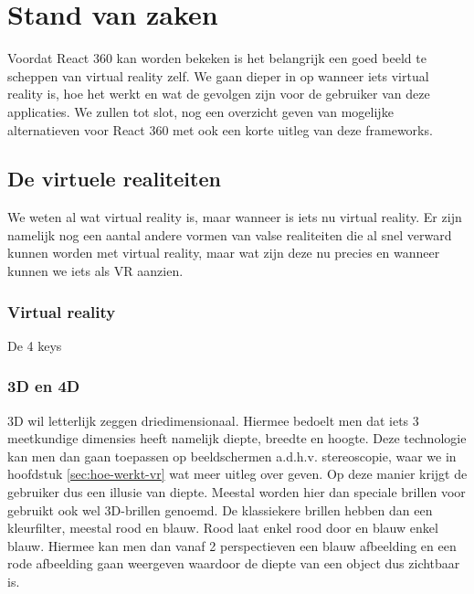 \chapter{Stand van zaken}
\label{ch:stand-van-zaken}



Voordat React 360 kan worden bekeken is het belangrijk een goed beeld te scheppen van virtual reality zelf. We gaan dieper in op wanneer iets virtual reality is, hoe het werkt en wat de gevolgen zijn voor de gebruiker van deze applicaties. We zullen tot slot, nog een overzicht geven van mogelijke alternatieven voor React 360 met ook een korte uitleg van deze frameworks.

\section{De virtuele realiteiten}
\label{sec:wanner-vr}
We weten al wat virtual reality is, maar wanneer is iets nu virtual reality. Er zijn namelijk nog een aantal andere vormen van valse realiteiten die al snel verward kunnen worden met virtual reality, maar wat zijn deze nu precies en wanneer kunnen we iets als VR aanzien.

\subsection{Virtual reality}
\label{subsec:virtual-reality}
\autocite{Sherman2000}
De 4 keys

\subsection{3D en 4D}
\label{subsec:3d-4d}
3D wil letterlijk zeggen driedimensionaal. Hiermee bedoelt men dat iets 3 meetkundige dimensies heeft namelijk diepte, breedte en hoogte. Deze technologie kan men dan gaan toepassen op beeldschermen a.d.h.v. stereoscopie, waar we in hoofdstuk \ref{sec:hoe-werkt-vr} wat meer uitleg over geven. Op deze manier krijgt de gebruiker dus een illusie van diepte. Meestal worden hier dan speciale brillen voor gebruikt ook wel 3D-brillen genoemd. De klassiekere brillen hebben dan een kleurfilter, meestal rood en blauw. Rood laat enkel rood door en blauw enkel blauw. Hiermee kan men dan vanaf 2 perspectieven een blauw afbeelding en een rode afbeelding gaan weergeven waardoor de diepte van een object dus zichtbaar is.

